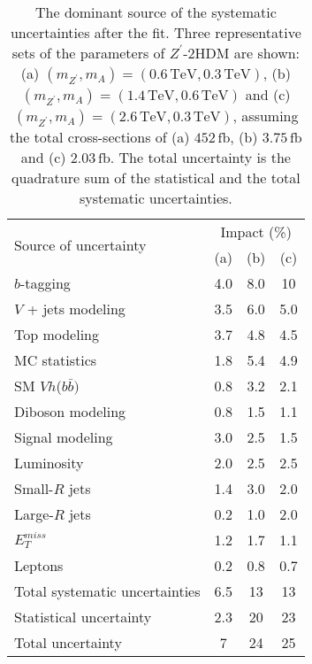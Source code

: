 \documentclass[class=NTHU_thesis, crop=false]{standalone}
\begin{document}
\begin{table}[h]
	\centering
	\begin{tabular}{ l c c c }
		\hline
		\multirow{2}{*}{Source of uncertainty} & \multicolumn{3}{c}{Impact (\%)} \\ \cline{2-4}
		 & (a) & (b) & (c) \\ \hline
		$b$-tagging & 4.0 & 8.0 & 10 \\
		$V$ + jets modeling & 3.5 & 6.0 & 5.0 \\
		Top modeling & 3.7 & 4.8 & 4.5 \\
		MC statistics & 1.8 & 5.4 & 4.9 \\
		SM $Vh$($b\bar{b})$ & 0.8 & 3.2 & 2.1 \\
		Diboson modeling & 0.8 & 1.5 & 1.1 \\
		Signal modeling & 3.0 & 2.5 & 1.5 \\
		Luminosity & 2.0 & 2.5 & 2.5 \\
		Small-$R$ jets & 1.4 & 3.0 & 2.0 \\
		Large-$R$ jets & 0.2 & 1.0 & 2.0 \\
		$E^{miss}_T$ & 1.2 & 1.7 & 1.1 \\
		Leptons & 0.2 & 0.8 & 0.7 \\ \hline
		Total systematic uncertainties & 6.5 & 13 & 13 \\
		Statistical uncertainty & 2.3 & 20 & 23 \\
		Total uncertainty & 7 & 24 & 25 \\ \hline
	\end{tabular}
	\caption{The dominant source of the systematic uncertainties after the fit. Three representative sets of the parameters of $Z^\prime$-2HDM are shown: (a) $(m_{Z^\prime}, m_A) = (0.6\, \mathrm{TeV}, 0.3\, \mathrm{TeV})$, (b) $(m_{Z^\prime}, m_A) = (1.4\, \mathrm{TeV}, 0.6\, \mathrm{TeV})$ and (c) $(m_{Z^\prime}, m_A) = (2.6\, \mathrm{TeV}, 0.3\, \mathrm{TeV})$, assuming the total cross-sections of (a) $452\, \mathrm{fb}$, (b) $3.75\, \mathrm{fb}$ and (c) $2.03\, \mathrm{fb}$. The total uncertainty is the quadrature sum of the statistical and the total systematic uncertainties.}
	\label{table:uncertainty_ranking}
\end{table}
\end{document}
